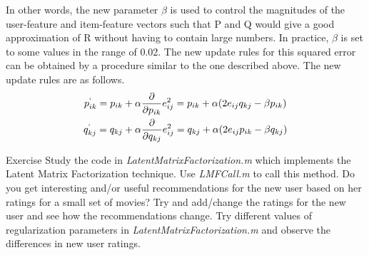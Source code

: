  In other words, the new parameter $\beta$ is used to control the magnitudes of the user-feature and item-feature vectors such that P and Q would give a good approximation of R without having to contain large numbers. In practice, $\beta$ is set to some values in the range of 0.02. The new update rules for this squared error can be obtained by a procedure similar to the one described above. The new update rules are as follows.
\begin{gather*}
      p^`_{ik} = p_{ik} + \alpha\frac{\partial}{\partial p_{ik}}e_{ij}^2 = p_{ik} + \alpha(2e_{ij}q_{kj} - \beta p_{ik}) \\
      q^`_{kj} = q_{kj} + \alpha\frac{\partial}{\partial q_{kj}}e_{ij}^2 = q_{kj} + \alpha(2e_{ij}p_{ik} - \beta q_{kj})
  \end{gather*}
\begin{myremark}{Exercise }
Study the code in \textit{LatentMatrixFactorization.m} which implements the Latent Matrix Factorization technique. Use \textit{LMFCall.m} to call this method. Do you get interesting and/or useful recommendations for the new user based on her ratings for a small set of movies? Try and add/change the ratings for the new user and see how the recommendations change. Try different values of regularization parameters in \textit{LatentMatrixFactorization.m} and observe the differences in new user ratings.
\end{myremark}
